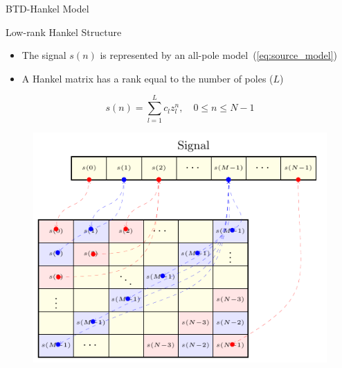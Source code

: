 \documentclass{beamer}
\begin{document}
	\begin{frame}{BTD-Hankel Model}
	
		\begin{block}{Low-rank Hankel Structure}
			\begin{itemize}
				\item The signal $s(n)$ is represented by an all-pole model~(\ref{eq:source_model})
        		\item A Hankel matrix has a rank equal to the number of poles ($L$)
		    \end{itemize}
		\end{block}
		\vspace{-10pt}
		\begin{equation}
			s(n) = \sum_{l = 1}^{L} c_{l} z_{l}^{n}, \quad 0\leq n \leq N-1  \label{eq:source_model}
		\end{equation}
		\vspace{-10pt}
		\begin{figure}[htb]
			\centering
			\includegraphics[scale=0.64]{figures/tikz_mapHankel_NOTATION.pdf}
		\end{figure}
	\end{frame}
\end{document}
